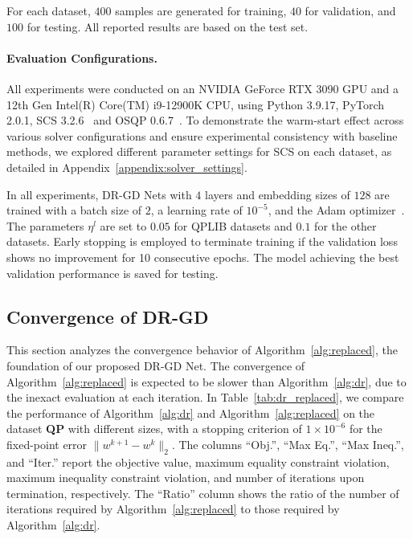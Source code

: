 \documentclass[10pt]{article} %
\newcommand{\red}[1]{{\color{red}#1}}
\begin{document}
For each dataset, $400$ samples are generated for training, $40$ for validation, and $100$ for testing. 
All reported results are based on the test set. 

\paragraph{Evaluation Configurations.} 
All experiments were conducted on an NVIDIA GeForce RTX 3090 GPU and a 12th Gen Intel(R) Core(TM) i9-12900K CPU, using Python 3.9.17, PyTorch 2.0.1, SCS 3.2.6~\citep{o2021operator} and OSQP 0.6.7~\citep{stellato2020osqp}. 
To demonstrate the warm-start effect across various solver configurations and ensure experimental consistency with baseline methods, we explored different parameter settings for SCS on each dataset, as detailed in Appendix~\ref{appendix:solver_settings}.

In all experiments, DR-GD Nets with $4$ layers and embedding sizes of $128$ are trained with a batch size of $2$, a learning rate of $10^{-5}$, and the Adam optimizer~\citep{kingma2014adam}. The parameters $\eta^l$ are set to $0.05$ for QPLIB datasets and $0.1$ for the other datasets.
Early stopping is employed to terminate training if the validation loss shows no improvement for 10 consecutive epochs. 
The model achieving the best validation performance is saved for testing.


\subsection{Convergence of DR-GD}
\label{sec:dr-gd}
This section analyzes the convergence behavior of Algorithm~\ref{alg:replaced}, the foundation of our proposed DR-GD Net.
The convergence of Algorithm~\ref{alg:replaced} is expected to be slower than Algorithm~\ref{alg:dr}, due to the inexact evaluation at each iteration. 
In Table~\ref{tab:dr_replaced}, we compare the performance of Algorithm~\ref{alg:dr} and Algorithm~\ref{alg:replaced} on the dataset \textbf{QP} with different sizes, with a stopping criterion of $1 \times 10^{-6}$ for the fixed-point error $\|w^{k+1}-w^k\|_2$. 
The columns \enquote{Obj.}, \enquote{Max Eq.}, \enquote{Max Ineq.}, and \enquote{Iter.} report the objective value, maximum equality constraint violation, maximum inequality constraint violation, and number of iterations upon termination, respectively. 
The \enquote{Ratio} column shows the ratio of the number of iterations required by Algorithm~\ref{alg:replaced} to those required by Algorithm~\ref{alg:dr}.
\end{document}

